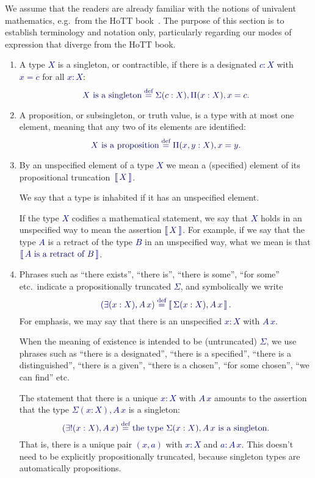 \documentclass[10pt]{article}
\makeatletter
\newcommand{\db}{\textcolor{darkblue}}
\newcommand\leftcolor[2]{%
  \edef\@tempa{#1}%
  \ifx\@tempa\@empty
    \edef\@tempa{darkblue}%
  \fi
 \mathinner\bgroup\begingroup\color{\@tempa}\left#2\normalcolor%
}
\newcommand\rightcolor[2]{%
  \edef\@tempa{#1}%
  \ifx\@tempa\@empty
    \edef\@tempa{darkblue}%
  \fi
  \color{\@tempa}\right#2\endgroup\egroup%
}
\newcommand{\trunc}[1]{\leftcolor{darkblue}\llbracket\,\db{#1}\,\rightcolor{darkblue}\rrbracket}
\newcommand{\m}[1]{\db{$#1$}}
\newcommand{\M}[1]{\[\db{#1}\]}
\newcommand{\eqdef}{\overset{\text{def}}{=}}
\theoremstyle{definition}
\makeatother
\begin{document}
We assume that the readers are already familiar with the notions of
univalent mathematics, e.g.\ from the HoTT book~\cite{hottbook}. The
purpose of this section is to establish terminology and notation only,
particularly regarding our modes of expression that diverge from the HoTT
book.
\begin{enumerate}
\item A type \m{X} is a singleton, or contractible, if there is a
  designated \m{c:X} with \m{x = c} for all \m{x:X}:
  \M{
    \text{\m{X} is a singleton} \eqdef \Sigma (c : X), \Pi (x:X), x = c.
  }

\item A proposition, or subsingleton, or truth value, is a type with
  at most one element, meaning that any two of its elements are
  identified:
  \M{
  \text{\m{X} is a proposition} \eqdef \Pi(x,y:X), x=y.
  }

\item
  By an unspecified element of a type \m{X} we mean a (specified)
  element of its propositional truncation~\m{\trunc{X}}.

  We say that a type is inhabited if it has an unspecified element.

  If the type \m{X} codifies a mathematical statement, we say that
  \m{X} holds in an unspecified way to mean the assertion
  \m{\trunc{X}}. For example, if we say that the type \m{A} is a
  retract of the type \m{B} in an unspecified way, what we mean is that
  \m{\trunc{\text{\m{A} is a retract of \m{B}}}}.

\item Phrases such as ``there exists'', ``there is'', ``there is some'', ``for some'' etc.\ indicate a propositionally truncated \m{\Sigma}, and symbolically we write  \M{(\exists (x:X), A \, x) \eqdef  \trunc{\Sigma (x:X), A \, x}.}
For emphasis, we may say that there is an unspecified \m{x:X} with \m{A\,x}.

  When the meaning of existence is intended to be (untruncated)
  \m{\Sigma}, we use phrases such as ``there is a designated'', ``there
  is a specified'', ``there is a distinguished'', ``there is a given'', ``there is a chosen'', ``for some chosen'', ``we can find'' etc.

  The statement that there is a unique \m{x:X} with \m{A \, x} amounts to
  the assertion that the type \m{\Sigma (x:X), A \, x} is a singleton:
  \M{
    (\exists! (x:X), A \, x) \eqdef \text{the type \m{\Sigma (x:X), A \, x} is a singleton}.
  }
  That is, there is a unique pair \m{(x,a)} with \m{x:X} and \m{a : A\,
  x}. This doesn't need to be explicitly propositionally truncated,
  because singleton types are automatically propositions.


\end{enumerate}
\end{document}
